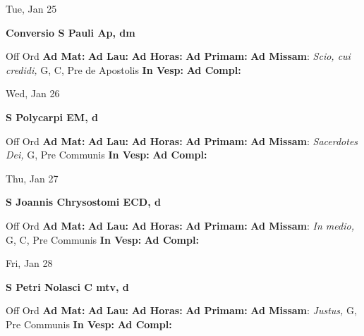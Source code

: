 \documentclass[10pt]{article}
\begin{document}
\begin{minipage}{3.5in}
\vspace{2em}\begin{center}
Tue, Jan 25
\end{center}\textbf{ \large Conversio S Pauli Ap, \textnormal{\normalsize dm}}
\begin{justify}
Off Ord
\textbf{Ad Mat: }
\textbf{Ad Lau: }
\textbf{Ad Horas: }
\textbf{Ad Primam: }
\textbf{Ad Missam}: \textit{Scio, cui credidi,} G, C, Pre de Apostolis
\textbf{In Vesp: }
\textbf{Ad Compl: }\end{justify}
\end{minipage}



\begin{minipage}{3.5in}
\vspace{2em}\begin{center}
Wed, Jan 26
\end{center}\textbf{ \large S Polycarpi EM, \textnormal{\normalsize d}}
\begin{justify}
Off Ord
\textbf{Ad Mat: }
\textbf{Ad Lau: }
\textbf{Ad Horas: }
\textbf{Ad Primam: }
\textbf{Ad Missam}: \textit{Sacerdotes Dei,} G, Pre Communis
\textbf{In Vesp: }
\textbf{Ad Compl: }\end{justify}
\end{minipage}



\begin{minipage}{3.5in}
\vspace{2em}\begin{center}
Thu, Jan 27
\end{center}\textbf{ \large S Joannis Chrysostomi ECD, \textnormal{\normalsize d}}
\begin{justify}
Off Ord
\textbf{Ad Mat: }
\textbf{Ad Lau: }
\textbf{Ad Horas: }
\textbf{Ad Primam: }
\textbf{Ad Missam}: \textit{In medio,} G, C, Pre Communis
\textbf{In Vesp: }
\textbf{Ad Compl: }\end{justify}
\end{minipage}



\begin{minipage}{3.5in}
\vspace{2em}\begin{center}
Fri, Jan 28
\end{center}\textbf{ \large S Petri Nolasci C mtv, \textnormal{\normalsize d}}
\begin{justify}
Off Ord
\textbf{Ad Mat: }
\textbf{Ad Lau: }
\textbf{Ad Horas: }
\textbf{Ad Primam: }
\textbf{Ad Missam}: \textit{Justus,} G, Pre Communis
\textbf{In Vesp: }
\textbf{Ad Compl: }\end{justify}
\end{minipage}
\end{document}
